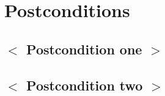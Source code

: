 \documentclass[notitlepage,fullpage]{article}
\begin{document}
\begin{comment}
  \begin{color}{blue}
	 \noindent There may be, and most likely will be, a number of alternative flows in a use case.  Keep each alternative flow separate to improve clarity.  Using alternative flows improves the readability of the use case, as well as preventing use cases from being decomposed into hierarchies of use cases.  Keep in mind that use cases are just textual descriptions, and their main purpose is to document the behavior of a system in a clear, concise, and understandable way.
  \end{color}
\end{comment}

\section{Postconditions}\label{sec:postconditions}

\begin{comment}
  \begin{color}{blue}
     \noindent A postcondition of a use case is a list of possible states that the system can be in immediately after the use case has finished.
  \end{color}
\end{comment}

\subsection{$<$ Postcondition one $>$}

\subsection{$<$ Postcondition two $>$}
\end{document}
